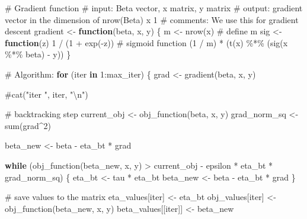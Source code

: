 \documentclass[
  letterpaper,
  DIV=11,
  numbers=noendperiod]{scrartcl}
\newenvironment{Shaded}{\begin{snugshade}}{\end{snugshade}}
\newcommand{\CommentTok}[1]{\textcolor[rgb]{0.37,0.37,0.37}{#1}}
\newcommand{\ControlFlowTok}[1]{\textcolor[rgb]{0.00,0.23,0.31}{\textbf{#1}}}
\newcommand{\DecValTok}[1]{\textcolor[rgb]{0.68,0.00,0.00}{#1}}
\newcommand{\FunctionTok}[1]{\textcolor[rgb]{0.28,0.35,0.67}{#1}}
\newcommand{\NormalTok}[1]{\textcolor[rgb]{0.00,0.23,0.31}{#1}}
\newcommand{\OtherTok}[1]{\textcolor[rgb]{0.00,0.23,0.31}{#1}}
\newcommand{\SpecialCharTok}[1]{\textcolor[rgb]{0.37,0.37,0.37}{#1}}
\begin{document}
\begin{Shaded}
\begin{Highlighting}[]
  \CommentTok{\# Gradient function}
  \CommentTok{\# input: Beta vector, x matrix, y matrix}
  \CommentTok{\# output: gradient vector in the dimension of nrow(Beta) x 1}
  \CommentTok{\# comments: We use this for gradient descent}
\NormalTok{  gradient }\OtherTok{\textless{}{-}} \ControlFlowTok{function}\NormalTok{(beta, x, y) \{}
\NormalTok{    m }\OtherTok{\textless{}{-}} \FunctionTok{nrow}\NormalTok{(x)                       }\CommentTok{\# define m}
\NormalTok{    sig }\OtherTok{\textless{}{-}} \ControlFlowTok{function}\NormalTok{(z) }\DecValTok{1} \SpecialCharTok{/}\NormalTok{ (}\DecValTok{1} \SpecialCharTok{+} \FunctionTok{exp}\NormalTok{(}\SpecialCharTok{{-}}\NormalTok{z))  }\CommentTok{\# sigmoid function}
\NormalTok{    (}\DecValTok{1} \SpecialCharTok{/}\NormalTok{ m) }\SpecialCharTok{*}\NormalTok{ (}\FunctionTok{t}\NormalTok{(x) }\SpecialCharTok{\%*\%}\NormalTok{ (}\FunctionTok{sig}\NormalTok{(x }\SpecialCharTok{\%*\%}\NormalTok{ beta) }\SpecialCharTok{{-}}\NormalTok{ y))}
\NormalTok{  \}}

  \CommentTok{\# Algorithm:}
  \ControlFlowTok{for}\NormalTok{ (iter }\ControlFlowTok{in} \DecValTok{1}\SpecialCharTok{:}\NormalTok{max\_iter) \{}
\NormalTok{    grad }\OtherTok{\textless{}{-}} \FunctionTok{gradient}\NormalTok{(beta, x, y)}
    
    \CommentTok{\#cat("iter ", iter, "\textbackslash{}n")}
    
    \CommentTok{\# backtracking step}
\NormalTok{    current\_obj }\OtherTok{\textless{}{-}} \FunctionTok{obj\_function}\NormalTok{(beta, x, y)}
\NormalTok{    grad\_norm\_sq }\OtherTok{\textless{}{-}} \FunctionTok{sum}\NormalTok{(grad}\SpecialCharTok{\^{}}\DecValTok{2}\NormalTok{)}
    
\NormalTok{    beta\_new }\OtherTok{\textless{}{-}}\NormalTok{ beta }\SpecialCharTok{{-}}\NormalTok{ eta\_bt }\SpecialCharTok{*}\NormalTok{ grad}
    
    \ControlFlowTok{while}\NormalTok{ (}\FunctionTok{obj\_function}\NormalTok{(beta\_new, x, y) }\SpecialCharTok{\textgreater{}}\NormalTok{ current\_obj }\SpecialCharTok{{-}}\NormalTok{ epsilon }\SpecialCharTok{*}\NormalTok{ eta\_bt }\SpecialCharTok{*}\NormalTok{ grad\_norm\_sq) \{}
\NormalTok{      eta\_bt }\OtherTok{\textless{}{-}}\NormalTok{ tau }\SpecialCharTok{*}\NormalTok{ eta\_bt}
\NormalTok{      beta\_new }\OtherTok{\textless{}{-}}\NormalTok{ beta }\SpecialCharTok{{-}}\NormalTok{ eta\_bt }\SpecialCharTok{*}\NormalTok{ grad}
\NormalTok{    \}}
    
    \CommentTok{\# save values to the matrix}
\NormalTok{    eta\_values[iter] }\OtherTok{\textless{}{-}}\NormalTok{ eta\_bt}
\NormalTok{    obj\_values[iter] }\OtherTok{\textless{}{-}} \FunctionTok{obj\_function}\NormalTok{(beta\_new, x, y)}
\NormalTok{    beta\_values[[iter]] }\OtherTok{\textless{}{-}}\NormalTok{ beta\_new}
    

\end{Highlighting}
\end{Shaded}
\end{document}
